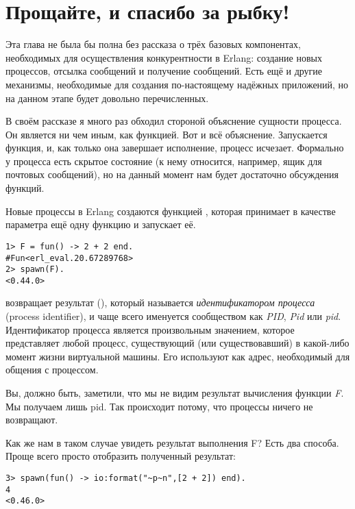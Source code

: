 \section{Прощайте, и спасибо за рыбку!}
\label{so-long-and-thanks-for-all-the-fish}
Эта глава не была бы полна без рассказа о трёх базовых компонентах, необходимых для осуществления конкурентности в Erlang: создание новых процессов, отсылка сообщений и получение сообщений.
Есть ещё и другие механизмы, необходимые для создания по\--настоящему надёжных приложений, но на данном этапе будет довольно перечисленных.

В своём рассказе я много раз обходил стороной объяснение сущности процесса.
Он является ни чем иным, как функцией.
Вот и всё объяснение.
Запускается функция, и, как только она завершает исполнение, процесс исчезает.
Формально у процесса есть скрытое состояние (к нему относится, например, ящик для почтовых сообщений), но на данный момент нам будет достаточно обсуждения функций.

Новые процессы в Erlang создаются функцией , которая принимает в качестве параметра ещё одну функцию и запускает её.
\begin{lstlisting}[style=erlang]
1> F = fun() -> 2 + 2 end.
#Fun<erl_eval.20.67289768>
2> spawn(F).
<0.44.0>
\end{lstlisting}

 возвращает результат (), который называется \emph{идентификатором процесса} (process identifier), и чаще всего именуется сообществом как \emph{PID}, \emph{Pid} или \emph{pid}.
Идентификатор процесса является произвольным значением, которое представляет любой процесс, существующий (или существовавший) в какой\--либо момент жизни виртуальной машины.
Его используют как адрес, необходимый для общения с процессом.

Вы, должно быть, заметили, что мы не видим результат вычисления функции \emph{F}.
Мы получаем лишь pid.
Так происходит потому, что процессы ничего не возвращают.

Как же нам в таком случае увидеть результат выполнения F?
Есть два способа.
Проще всего просто отобразить полученный результат:
\begin{lstlisting}[style=erlang]
3> spawn(fun() -> io:format("~p~n",[2 + 2]) end).
4
<0.46.0>
\end{lstlisting}

